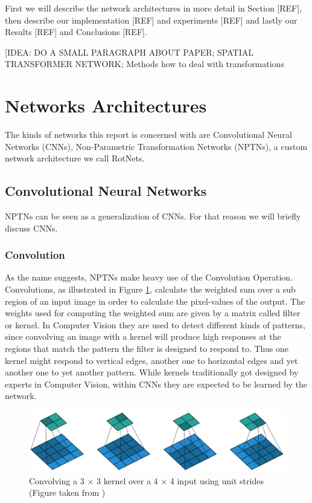 \documentclass{llncs}
\begin{document}
First we will describe the network architectures in more detail in Section [REF], then describe our implementation [REF] and experiments [REF] and lastly our Results [REF] and Conclusions [REF].

[IDEA: DO A SMALL PARAGRAPH ABOUT PAPER; SPATIAL TRANSFORMER NETWORK; Methods how to deal with transformations

\section{Networks Architectures}
The kinds of networks this report is concerned with are Convolutional Neural Networks (CNNs), Non-Parametric Transformation Networks (NPTNs), a custom network architecture we call RotNets.

\subsection{Convolutional Neural Networks}
NPTNs can be seen as a generalization of CNNs. For that reason we will briefly discuss CNNs. 
\subsubsection{Convolution}
As the name suggests, NPTNs make heavy use of the Convolution Operation. Convolutions, as illustrated in Figure \ref{fig:conv}, calculate the weighted sum over a sub region of an input image in order to calculate the pixel-values of the output. The weights used for computing the weighted sum are given by a matrix called filter or kernel. In Computer Vision they are used to detect different kinds of patterns, since convolving an image with a kernel will produce high responses at the regions that match the pattern the filter is designed to respond to. Thus one kernel might respond to vertical edges, another  one to horizontal edges and yet another one to yet another pattern. While kernels traditionally got designed by experts in Computer Vision, within CNNs they are expected to be learned by the network.
\begin{figure}
	\begin{center}
		\includegraphics[width=\textwidth]{result_images/Conv.png}
		\caption{Convolving a 3 $\times$ 3 kernel over a 4 $\times$ 4 input using unit strides (Figure taken from \cite{ConvArithmetic16})}
		\label{fig:conv}
	\end{center}
\end{figure}
\end{document}
